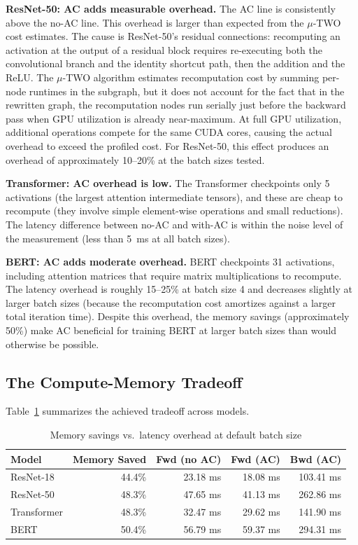 \documentclass[11pt]{article}
\begin{document}
\textbf{ResNet-50: AC adds measurable overhead.} The AC line is
consistently above the no-AC line. This overhead is larger than expected
from the $\mu$-TWO cost estimates. The cause is ResNet-50's residual
connections: recomputing an activation at the output of a residual block
requires re-executing both the convolutional branch and the identity
shortcut path, then the addition and the ReLU. The $\mu$-TWO algorithm
estimates recomputation cost by summing per-node runtimes in the subgraph,
but it does not account for the fact that in the rewritten graph, the
recomputation nodes run serially just before the backward pass when GPU
utilization is already near-maximum. At full GPU utilization, additional
operations compete for the same CUDA cores, causing the actual overhead to
exceed the profiled cost. For ResNet-50, this effect produces an overhead
of approximately 10--20\% at the batch sizes tested.

\textbf{Transformer: AC overhead is low.} The Transformer checkpoints only
5 activations (the largest attention intermediate tensors), and these are
cheap to recompute (they involve simple element-wise operations and small
reductions). The latency difference between no-AC and with-AC is within
the noise level of the measurement (less than 5~ms at all batch sizes).

\textbf{BERT: AC adds moderate overhead.} BERT checkpoints 31 activations,
including attention matrices that require matrix multiplications to recompute.
The latency overhead is roughly 15--25\% at batch size 4 and decreases
slightly at larger batch sizes (because the recomputation cost amortizes
against a larger total iteration time). Despite this overhead, the memory
savings (approximately 50\%) make AC beneficial for training BERT at larger
batch sizes than would otherwise be possible.

\subsection{The Compute-Memory Tradeoff}

Table~\ref{tab:tradeoff} summarizes the achieved tradeoff across models.

\begin{table}[H]
\centering
\caption{Memory savings vs.\ latency overhead at default batch size}
\label{tab:tradeoff}
\begin{tabular}{lrrrr}
\toprule
\textbf{Model} & \textbf{Memory Saved} & \textbf{Fwd (no AC)} & \textbf{Fwd (AC)} & \textbf{Bwd (AC)} \\
\midrule
ResNet-18   & 44.4\% & 23.18 ms & 18.08 ms & 103.41 ms \\
ResNet-50   & 48.3\% & 47.65 ms & 41.13 ms & 262.86 ms \\
Transformer & 48.3\% & 32.47 ms & 29.62 ms & 141.90 ms \\
BERT        & 50.4\% & 56.79 ms & 59.37 ms & 294.31 ms \\
\bottomrule
\end{tabular}
\end{table}
\end{document}
